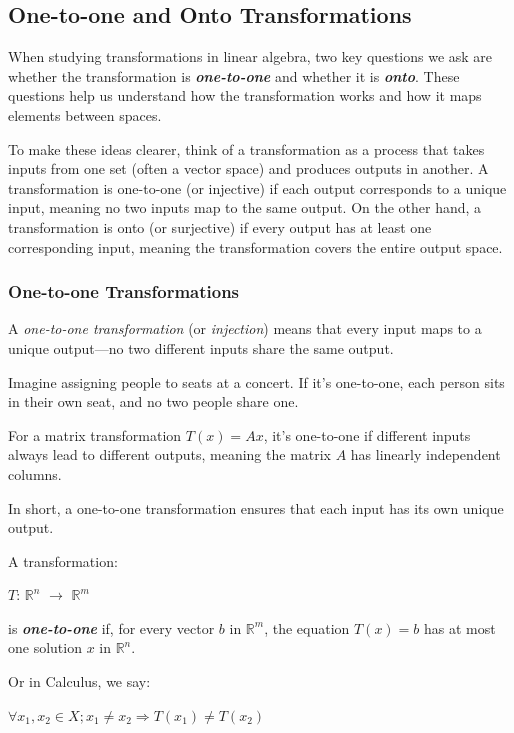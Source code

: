 \documentclass[a4paper,12pt]{article}
\begin{document}
\subsection{One-to-one and Onto Transformations}
When studying transformations in linear algebra, two key questions we ask are whether the transformation is \textbf{\textit{one-to-one}} and whether it is \textbf{\textit{onto}}. These questions help us understand how the transformation works and how it maps elements between spaces.

To make these ideas clearer, think of a transformation as a process that takes inputs from one set (often a vector space) and produces outputs in another. A transformation is one-to-one (or injective) if each output corresponds to a unique input, meaning no two inputs map to the same output. On the other hand, a transformation is onto (or surjective) if every output has at least one corresponding input, meaning the transformation covers the entire output space.

\subsubsection{One-to-one Transformations} A \textit{one-to-one transformation} (or \textit{injection}) means that every input maps to a unique output---no two different inputs share the same output.

Imagine assigning people to seats at a concert. If it's one-to-one, each person sits in their own seat, and no two people share one.

For a matrix transformation \( T(x) = Ax \), it's one-to-one if different inputs always lead to different outputs, meaning the matrix \( A \) has linearly independent columns.

In short, a one-to-one transformation ensures that each input has its own unique output.

\begin{tcolorbox}[title=Definition (One-to-one transformations),colframe=blue!70!black, colback=blue!5!white]
A transformation:
\begin{center}
    $T$: \(\mathbb{R}^n\) $\rightarrow$ \(\mathbb{R}^m\)
\end{center}

is \textbf{\textit{one-to-one}} if, for every vector $b$ in \(\mathbb{R}^m\), the equation $T(x) = b$ has at most one solution $x$ in \(\mathbb{R}^n\). 
\end{tcolorbox}
Or in Calculus, we say:
\begin{center}
    $\forall x_1,x_2 \in X; x_1 \neq x_2 \Rightarrow{} T(x_1) \neq T(x_2)$
\end{center}
\end{document}
